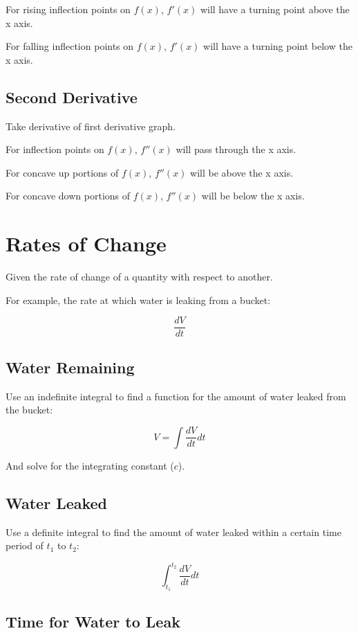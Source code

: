 \documentclass[a4paper,11pt]{article}
\begin{document}
For rising inflection points on $f(x)$, $f'(x)$ will have a turning point above
the x axis.

For falling inflection points on $f(x)$, $f'(x)$ will have a turning point
below the x axis.


\subsection{Second Derivative}

Take derivative of first derivative graph.

For inflection points on $f(x)$, $f''(x)$ will pass through the x axis.

For concave up portions of $f(x)$, $f''(x)$ will be above the x axis.

For concave down portions of $f(x)$, $f''(x)$ will be below the x axis.




\section{Rates of Change}

Given the rate of change of a quantity with respect to another.

For example, the rate at which water is leaking from a bucket:

$$
\frac{dV}{dt}
$$


\subsection{Water Remaining}

Use an indefinite integral to find a function for the amount of water leaked
from the bucket:

$$
V = \int \frac{dV}{dt} dt
$$

And solve for the integrating constant ($c$).


\subsection{Water Leaked}

Use a definite integral to find the amount of water leaked within a certain
time period of $t_1$ to $t_2$:

$$
\int_{t_1}^{t_2} \frac{dV}{dt} dt
$$


\subsection{Time for Water to Leak}
\end{document}
